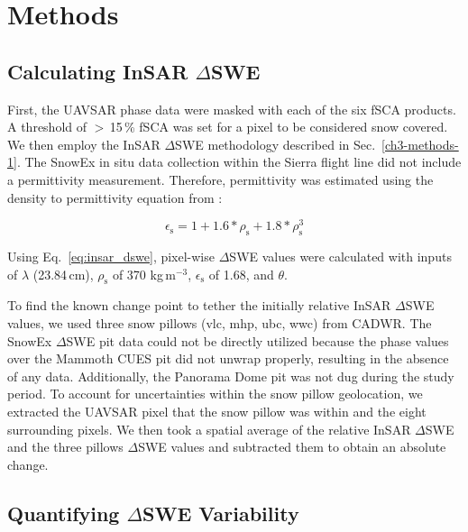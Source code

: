 \hypertarget{ch4-methods}{\section{Methods}\label{ch4-methods}}
\hypertarget{ch4-methods-1}{\subsection{Calculating InSAR $\Delta$SWE}\label{ch4-methods-1}}


First, the UAVSAR phase data were masked with each of the six fSCA products. A threshold of $>$\,15\,\% fSCA was set for a pixel to be considered snow covered. We then employ the InSAR $\Delta$SWE methodology described in Sec.~\ref{ch3-methods-1}. The SnowEx in situ data collection within the Sierra flight line did not include a permittivity measurement. Therefore, permittivity was estimated using the density to permittivity equation from \cite{guneriussenInSAREstimationChanges2001}:

\begin{equation}
\epsilon_\mathrm{s} = 1 + 1.6 * \rho_\mathrm{s} + 1.8 * \rho_\mathrm{s}^3
\label{eq:dens_to_perm}
\end{equation}


\noindent Using Eq.~\ref{eq:insar_dswe}, pixel-wise $\Delta$SWE values were calculated with inputs of $\lambda$ (23.84\,cm), $\rho_\mathrm{s}$ of 370 kg\,m$^{-3}$, $\epsilon_\mathrm{s}$ of 1.68, and $\theta$. 

To find the known change point to tether the initially relative InSAR $\Delta$SWE values, we used three snow pillows (vlc, mhp, ubc, wwc) from CADWR. The SnowEx $\Delta$SWE pit data could not be directly utilized because the phase values over the Mammoth CUES pit did not unwrap properly, resulting in the absence of any data. Additionally, the Panorama Dome pit was not dug during the study period. To account for uncertainties within the snow pillow geolocation, we extracted the UAVSAR pixel that the snow pillow was within and the eight surrounding pixels. We then took a spatial average of the relative InSAR $\Delta$SWE and the three pillows $\Delta$SWE values and subtracted them to obtain an absolute change.

\hypertarget{ch4-methods-2}{\subsection{Quantifying $\Delta$SWE Variability}\label{ch4-methods-1}}


